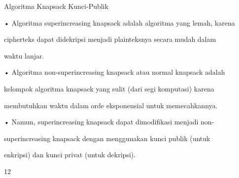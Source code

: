 \documentclass{article}
\begin{document}

Algoritma Knapsack Kunci-Publik

• Algoritma superincreasing knapsack adalah algoritma yang lemah, karena 

cipherteks dapat didekripsi menjadi plainteksnya secara mudah dalam 

waktu lanjar. 

• Algoritma non-superincreasing knapsack atau normal knapsack adalah 

kelompok algoritma knapsack yang sulit (dari segi komputasi) karena 

membutuhkan waktu dalam orde eksponensial untuk memecahkannya.

• Namun, superincreasing knapsack dapat dimodifikasi menjadi non-

superincreasing knapsack dengan menggunakan kunci publik (untuk 

enkripsi) dan kunci privat (untuk dekripsi). 

12
\end{document}
